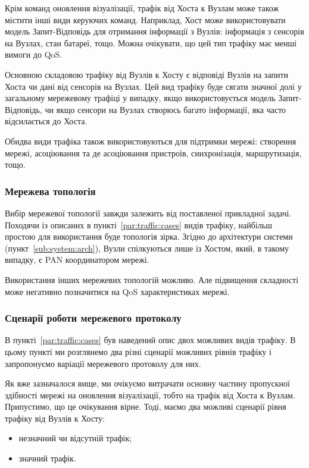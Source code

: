 \documentclass[a4paper,ukrainian,utf8,nocolumnsxix,floatsection]{eskdtext}
\renewcommand\paragraph{\subsubsection}
\begin{document}
Крім команд оновлення візуалізації, трафік від Хоста к Вузлам може також містити інші види керуючих команд. Наприклад, Хост може використовувати модель Запит-Відповідь для отримання інформації з Вузлів: інформація з сенсорів на Вузлах, стан батареї, тощо. Можна очікувати, що цей тип трафіку має менші вимоги до QoS.

Основною складовою трафіку від Вузлів к Хосту є відповіді Вузлів на запити Хоста чи дані від сенсорів на Вузлах. Цей вид трафіку буде сягати значної долі у загальному мережевому трафіці у випадку, якщо використовується модель Запит-Відповідь, чи якщо сенсори на Вузлах створюсь багато інформації, яка часто відсилається до Хоста.

Обидва види трафіка також використовуються для підтримки мережі: створення мережі, асоціювання та де асоціювання пристроїв, синхронізація, маршрутизація, тощо.

\paragraph{Мережева топологія}

Вибір мережевої топології завжди залежить від поставленої прикладної задачі. Походячи із описаних в пункті~\ref{par:traffic:cases} видів трафіку, найбільш простою для використання буде топологія зірка. Згідно до архітектури системи (пункт~\ref{sub:system:arch}), Вузли спілкуються лише із Хостом, який, в такому випадку, є PAN координатором мережі.

Використання інших мережевих топологій можливо. Але підвищення складності може негативно позначитися на QoS характеристиках мережі.

\paragraph{Сценарії роботи мережевого протоколу}
\label{par:network:protocol:scenarios}

В пункті~\ref{par:traffic:cases} був наведений опис двох можливих видів трафіку. В цьому пункті ми розглянемо два різні сценарії можливих рівнів трафіку і запропонуємо варіації мережевого протоколу для них.

Як вже зазначалося вище, ми очікуємо витрачати основну частину пропускної здібності мережі на оновлення візуалізації, тобто на трафік від Хоста к Вузлам. Припустимо, що це очікування вірне. Тоді, маємо два можливі сценарії рівня трафіку від Вузлів к Хосту:
\begin{itemize}
	\item незначний чи відсутній трафік;
	\item значний трафік.
\end{itemize}
\end{document}
